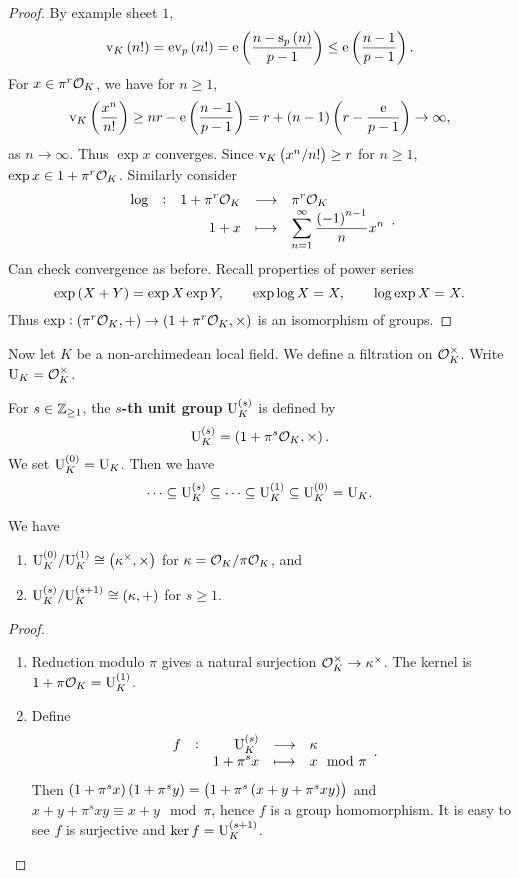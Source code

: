 \begin{proof}
By example sheet $ 1 $,
$$ \v_K\br{n!} = \e\v_p\br{n!} = \e\br{\dfrac{n - \s_p\br{n}}{p - 1}} \le \e\br{\dfrac{n - 1}{p - 1}}. $$
For $ x \in \pi^r\mathcal{O}_K $, we have for $ n \ge 1 $,
$$ \v_K\br{\dfrac{x^n}{n!}} \ge nr - \e\br{\dfrac{n - 1}{p - 1}} = r + \br{n - 1}\br{r - \dfrac{\e}{p - 1}} \to \infty, $$
as $ n \to \infty $. Thus $ \exp x $ converges. Since $ \v_K\br{x^n / n!} \ge r $ for $ n \ge 1 $, $ \exp x \in 1 + \pi^r\mathcal{O}_K $. Similarly consider
$$ \function[\log]{1 + \pi^r\OOO_K}{\pi^r\OOO_K}{1 + x}{\sum_{n = 1}^\infty \dfrac{\br{-1}^{n - 1}}{n}x^n}. $$
Can check convergence as before. Recall properties of power series
$$ \exp \br{X + Y} = \exp X\exp Y, \qquad \exp \log X = X, \qquad \log \exp X = X. $$
Thus $ \exp : \br{\pi^r\OOO_K, +} \to \br{1 + \pi^r\OOO_K, \times} $ is an isomorphism of groups.
\end{proof}

Now let $ K $ be a non-archimedean local field. We define a filtration on $ \mathcal{O}_K^\times $. Write $ \mathrm{U}_K = \mathcal{O}_K^\times $.

\begin{definition}
For $ s \in \mathbb{Z}_{\ge 1} $, the \textbf{$ s $-th unit group} $ \U_K^{\br{s}} $ is defined by
$$ \U_K^{\br{s}} = \br{1 + \pi^s\OOO_K, \times}. $$
We set $ \U_K^{\br{0}} = \U_K $. Then we have
$$ \dots \subseteq \U_K^{\br{s}} \subseteq \dots \subseteq \U_K^{\br{1}} \subseteq \U_K^{\br{0}} = \U_K. $$
\end{definition}

\begin{proposition}
\label{prop:15.3}
We have
\begin{enumerate}
\item $ \U_K^{\br{0}} / \U_K^{\br{1}} \cong \br{\kappa^\times, \times} $ for $ \kappa = \mathcal{O}_K / \pi\mathcal{O}_K $, and
\item $ \U_K^{\br{s}} / \U_K^{\br{s + 1}} \cong \br{\kappa, +} $ for $ s \ge 1 $.
\end{enumerate}
\end{proposition}

\begin{proof}
\hfill
\begin{enumerate}
\item Reduction modulo $ \pi $ gives a natural surjection $ \mathcal{O}_K^\times \to \kappa^\times $. The kernel is $ 1 + \pi\OOO_K = \U_K^{\br{1}} $.
\item Define
$$ \function[f]{\U_K^{\br{s}}}{\kappa}{1 + \pi^sx}{x \mod \pi}. $$
Then $ \br{1 + \pi^sx}\br{1 + \pi^sy} = \br{1 + \pi^s\br{x + y + \pi^sxy}} $ and $ x + y + \pi^sxy \equiv x + y \mod \pi $, hence $ f $ is a group homomorphism. It is easy to see $ f $ is surjective and $ \ker f = \U_K^{\br{s + 1}} $.
\end{enumerate}
\end{proof}

